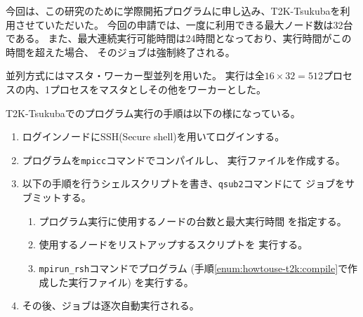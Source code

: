 今回は、この研究のために学際開拓プログラムに申し込み、T2K-Tsukubaを利用させていただいた。
今回の申請では、一度に利用できる最大ノード数は32台である。
また、最大連続実行可能時間は24時間となっており、実行時間がこの時間を超えた場合、
そのジョブは強制終了される。

並列方式にはマスタ・ワーカー型並列を用いた。
実行は全$16 \times 32 = 512$プロセスの内、1プロセスをマスタとしその他をワーカーとした。

T2K-Tsukubaでのプログラム実行の手順は以下の様になっている。
\begin{enumerate}
	\item ログインノードにSSH(Secure shell)を用いてログインする。
	\item プログラムを{\tt mpicc}コマンドでコンパイルし、
	実行ファイルを作成する。 \label{enum:howtouse-t2k:compile}
	\item 以下の手順を行うシェルスクリプトを書き、{\tt qsub2}コマンドにて
 	ジョブをサブミットする。
  	\begin{enumerate}
   		\item プログラム実行に使用するノードの台数と最大実行時間
     		を指定する。
   		\item 使用するノードをリストアップするスクリプトを
     		実行する。
       		\item {\tt mpirun\_rsh}コマンドでプログラム
         	(手順\ref{enum:howtouse-t2k:compile}で作成した実行ファイル)
          	を実行する。
   	\end{enumerate}
    	\item その後、ジョブは逐次自動実行される。
\end{enumerate}
